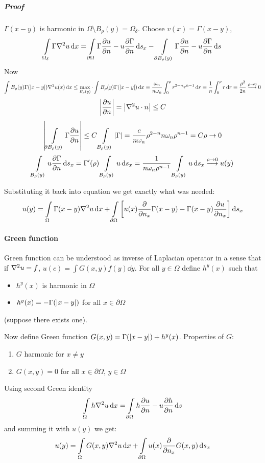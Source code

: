 \subparagraph{Proof}
$\Gamma(x-y)$ is harmonic in $\Omega \setminus B_\rho(y) = \Omega_\delta$.
Choose $v(x) = \Gamma(x-y)$,
$$\int\limits_{\Omega_\delta} \Gamma\laplacian{u} \dd{x} = \int\limits_{\partial \Omega} \Gamma \pdv{u}{n} - u \pdv{\Gamma}{n} \dd{s_x} -  \int\limits_{\partial B_\rho(y)} \Gamma \pdv{u}{n} - u \pdv{\Gamma}{n} \dd{s} $$
Now
$$\int\limits{B_\rho(y)} \Gamma(\abs{x-y}) \laplacian{u(x)} \dd{x} \leq \max\limits_{B_\rho(y)} \cdot \int\limits{B_\rho(y)} \Gamma(\abs{x-y})  \dd{x} = \frac{\omega_n}{n\omega_n} \int_0^\rho r^{2-n}r^{n-1} \dd{r} = \frac{1}{n} \int_0^\rho  r \dd{r} = \frac{\rho^2}{2n} \stackrel{\rho\to 0}{\longrightarrow} 0 $$
$$\abs{\pdv{u}{n}} = \abs{\laplacian{u} \cdot n} \leq C $$
$$\abs{ \int\limits_{\partial B_\rho(y)} \Gamma \pdv{u}{n}} \leq C \int\limits_{B_\rho(y)} \abs{\Gamma} = \frac{c}{n\omega_n} \rho^{2-n} n\omega_n \rho^{n-1} =C \rho \to 0$$
$$\int\limits_{B_\rho(y)} u \pdv{\Gamma}{n} \dd{s_x} = \Gamma'(\rho)\int\limits_{B_\rho(y)} u \dd{s_x} = \frac{1}{n\omega_n \rho^{n-1}} \int\limits_{B_\rho(y)} u \dd{s_x}\stackrel{\rho\to 0}{\longrightarrow} u(y) $$

Substituting it back into equation we get exactly what was needed:
$$u(y) = \int\limits_{\Omega} \Gamma(x-y) \laplacian{u} \dd{x} + \int\limits_{\partial \Omega} \qty[u(x) \pdv{n_x}\Gamma(x-y) - \Gamma(x-y) \pdv{u}{n_x}] \dd{s_x}$$

\paragraph{Green function}
 Green function can be understood as inverse of Laplacian operator in a sense that if $\laplacian{u} = f$, $u(c) = \int G(x,y) f(y) \dd{y}$.
For all $y\in \Omega$ define $h^y(x)$ such that
\begin{itemize}
	\item $h^y(x)$ is harmonic in $\Omega$
	\item $h^y(x) = -\Gamma(\abs{x-y})$ for all $x\in \partial \Omega$ 
\end{itemize}
(suppose there exists one).

Now define Green function $G(x,y) = \Gamma(\abs{x-y}) + h^y(x)$. Properties of $G$:
\begin{enumerate}
	\item $G$ harmonic for $x\neq y$
	\item $G(x,y) = 0$ for all $x\in \partial \Omega$, $y\in \Omega$
\end{enumerate}

Using second Green identity
$$\int\limits_{\Omega} h\laplacian{u} \dd{x} = \int\limits_{\partial \Omega} h \pdv{u}{n} - u \pdv{h}{n} \dd{s} $$
and summing it with $u(y)$ we get:
$$u(y) = \int\limits_{\Omega} G(x,y) \laplacian{u} \dd{x} + \int\limits_{\partial \Omega} u(x) \pdv{n_x}G(x,y) \dd{s_x}$$
